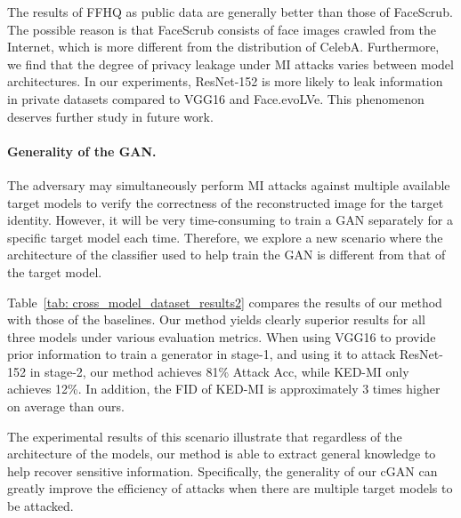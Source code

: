 \documentclass[letterpaper]{article} %
\newcommand{\Tref}[1]{Table~\ref{#1}}
\begin{document}
The results of FFHQ as public data are generally better than those of FaceScrub. The possible reason is that FaceScrub consists of face images crawled from the Internet, which is more different from the distribution of CelebA. Furthermore, we find that the degree of privacy leakage under MI attacks varies between model architectures. In our experiments, ResNet-152 is more likely to leak information in private datasets compared to VGG16 and Face.evoLVe. This phenomenon deserves further study in future work.

\paragraph{Generality of the GAN.}
The adversary may simultaneously perform MI attacks against multiple available target models to verify the correctness of the reconstructed image for the target identity. However, it will be very time-consuming to train a GAN separately for a specific target model each time. Therefore, we explore a new scenario where the architecture of the classifier used to help train the GAN is different from that of the target model.

\Tref{tab: cross_model_dataset_results2} compares the results of our method with those of the baselines. Our method yields clearly superior results for all three models under various evaluation metrics. When using VGG16 to provide prior information to train a generator in stage-1, and using it to attack ResNet-152 in stage-2, our method achieves 81\% Attack Acc, while KED-MI only achieves 12\%. In addition, the FID of KED-MI is approximately 3 times higher on average than ours.

The experimental results of this scenario illustrate that regardless of the architecture of the models, our method is able to extract general knowledge to help recover sensitive information. Specifically, the generality of our cGAN can greatly improve the efficiency of attacks when there are multiple target models to be attacked.
\end{document}
